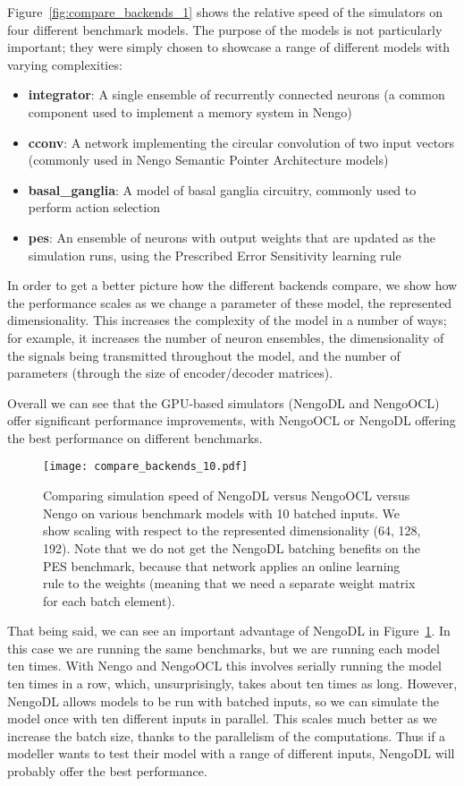 \documentclass{article}
\begin{document}
Figure~\ref{fig:compare_backends_1} shows the relative speed of the simulators on four different benchmark models.  The purpose of the models is not particularly important; they were simply chosen to showcase a range of different models with varying complexities:

\begin{itemize}
\item {\bf integrator}: A single ensemble of recurrently connected neurons (a common component used to implement a memory system in Nengo)
\item {\bf cconv}: A network implementing the circular convolution of two input vectors (commonly used in Nengo Semantic Pointer Architecture models)
\item {\bf basal\_ganglia}: A model of basal ganglia circuitry, commonly used to perform action selection
\item {\bf pes}: An ensemble of neurons with output weights that are updated as the simulation runs, using the Prescribed Error Sensitivity learning rule \citep{MacNeil2011}
\end{itemize}

In order to get a better picture how the different backends compare, we show how the performance scales as we change a parameter of these model, the represented dimensionality. This increases the complexity of the model in a number of ways; for example, it increases the number of neuron ensembles, the dimensionality of the signals being transmitted throughout the model, and the number of parameters (through the size of encoder/decoder matrices).

Overall we can see that the GPU-based simulators (NengoDL and NengoOCL) offer significant performance improvements, with NengoOCL or NengoDL offering the best performance on different benchmarks.

\begin{figure}
\centering
\texttt{[image: compare\_backends\_10.pdf]}
\caption{Comparing simulation speed of NengoDL versus NengoOCL versus Nengo on various benchmark models with 10 batched inputs.  We show scaling with respect to the represented dimensionality (64, 128, 192).  Note that we do not get the NengoDL batching benefits on the PES benchmark, because that network applies an online learning rule to the weights (meaning that we need a separate weight matrix for each batch element).}
\label{fig:compare_backends_10}
\end{figure}

That being said, we can see an important advantage of NengoDL in Figure~\ref{fig:compare_backends_10}.  In this case we are running the same benchmarks, but we are running each model ten times.  With Nengo and NengoOCL this involves serially running the model ten times in a row, which, unsurprisingly, takes about ten times as long.  However, NengoDL allows models to be run with batched inputs, so we can simulate the model once with ten different inputs in parallel.  This scales much better as we increase the batch size, thanks to the parallelism of the computations.  Thus if a modeller wants to test their model with a range of different inputs, NengoDL will probably offer the best performance.
\end{document}
